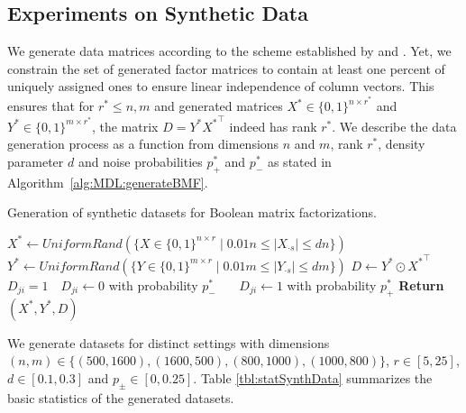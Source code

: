 \subsection{Experiments on Synthetic Data} \label{sec:MDL:SynthData}
We generate data matrices according to the scheme established by \cite{miettinen2014mdl4bmf,karaev2015getting} and \cite{lucchese2014unifying}. Yet, we constrain the set of generated factor matrices to contain at least one percent of uniquely assigned ones to ensure linear independence of column vectors. This ensures that for $r^*\leq n,m$ and generated matrices $X^*\in\{0,1\}^{n\times r^*}$ and $Y^*\in\{0,1\}^{m\times r^*}$, the matrix $D=Y^* {X^*}^\top $ indeed has rank $r^*$. We describe the data generation process as a function from dimensions $n$ and $m$, rank $r^*$, density parameter $d$ and noise probabilities $p_+^*$ and $p_-^*$ as stated in Algorithm~\ref{alg:MDL:generateBMF}. 
\begin{algorithm}[t]
\caption{Generation of synthetic datasets for Boolean matrix factorizations.}
\begin{algorithmic}[1]
  	\State $X^*\gets UniformRand(\{X\in\{0,1\}^{n\times r}\mid 0.01n\leq|X_{\cdot s}|\leq dn\})$
  	\State $Y^*\gets UniformRand(\{Y\in\{0,1\}^{m\times r}\mid 0.01m\leq|Y_{\cdot s}|\leq dm\})$
  	\State $D\gets Y^*\odot {X^*}^\top$
  	    \State \algorithmicif\ $D_{ji}=1$\ \algorithmicthen\ $D_{ji}\gets 0$ with probability $p_-^*$ 
  	    \State {}\ \algorithmicelse\ \ $D_{ji}\gets 1$ with probability $p_+^*$ 
    \EndFor
    \State \textbf{Return} $(X^*,Y^*,D)$
  \EndFunction
\end{algorithmic}
\label{alg:MDL:generateBMF}
\end{algorithm}
We generate datasets for distinct settings with dimensions $(n,m)\in\{(500,1600),\allowbreak(1600,500),\allowbreak(800,1000),\allowbreak(1000,800)\}$, $r\in[5,25]$, $d\in [0.1,0.3]$ and $p_\pm\in [0,0.25]$. 
Table \ref{tbl:statSynthData} summarizes the basic statistics of the generated datasets.   
